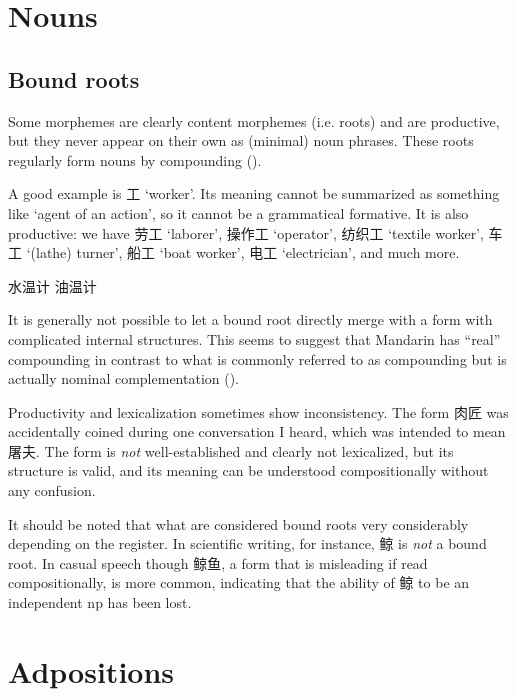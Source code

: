 \documentclass[UTF8, a4paper, oneside, scheme=plain, 12pt]{ctexrep}
\newcommand{\translate}[1]{`#1'}
\begin{document}
\chapter{Nouns}

\section{Bound roots}

Some morphemes are clearly content morphemes (i.e. roots) and are productive,
but they never appear on their own as (minimal) noun phrases.
These roots regularly form nouns by compounding ().

A good example is 工 \translate{worker}.
Its meaning cannot be summarized as something like \translate{agent of an action},
so it cannot be a grammatical formative.
It is also productive:
we have 劳工 \translate{laborer}, 操作工 \translate{operator}, 纺织工 \translate{textile worker}, 车工 \translate{(lathe) turner}, 船工 \translate{boat worker}, 电工 \translate{electrician}, and much more.

\begin{exe}
    \ex 水温计
    \ex 油温计
\end{exe}

It is generally not possible to let a bound root directly merge with a form with complicated internal structures.
This seems to suggest that Mandarin has ``real'' compounding in contrast to what is commonly referred to as compounding but is actually nominal complementation ().

Productivity and lexicalization sometimes show inconsistency.
The form 肉匠 was accidentally coined during one conversation I heard,
which was intended to mean 屠夫.
The form is \emph{not} well-established and clearly not lexicalized,
but its structure is valid, and its meaning can be understood
compositionally without any confusion.

It should be noted that what are considered bound roots very considerably depending on the register.
In scientific writing, for instance, 鲸 is \emph{not} a bound root.
In casual speech though 鲸鱼, a form that is misleading if read compositionally, is more common,
indicating that the ability of 鲸 to be an independent \ac{np} has been lost.

\chapter{Adpositions}\label{chap:adpositions}
\end{document}
